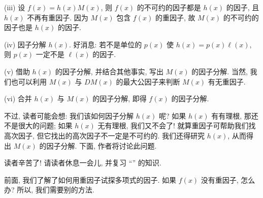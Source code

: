 (iii) 设 $f(x) = h(x) M(x)$, 则 $f(x)$ 的不可约的因子都是 $h(x)$ 的因子, 且 $h(x)$ 不再有重因子. 因为 $M(x)$ 包含 $f(x)$ 的重因子, 故 $M(x)$ 的不可约的因子也是 $h(x)$ 的因子.

(iv) 因子分解 $h(x)$. 好消息: 若不是单位的 $p(x)$ 使 $h(x) = p(x) \ell(x)$, 则 $p(x)$ 一定不是 $\ell (x)$ 的因子.

(v) 借助 $h(x)$ 的因子分解, 并结合其他事实, 写出 $M(x)$ 的因子分解. 当然, 我们也可以利用 $M(x)$ 与 $DM(x)$ 的最大公因子来判断 $M(x)$ 有无重因子.

(vi) 合并 $h(x)$ 与 $M(x)$ 的因子分解, 即得 $f(x)$ 的因子分解.

不过, 读者可能会想: 我们该如何因子分解 $h(x)$ 呢? 如果 $h(x)$ 有有理根, 那还不是很大的问题; 如果 $h(x)$ 无有理根, 我们又不会了! 就算重因子可帮助我们找高次因子, 但它找出的高次因子不一定是不可约的. 我们还得研究 $h(x)$, 从而得出 $M(x)$ 的因子分解. 下面, 作者将讨论此问题.

读者辛苦了! 请读者休息一会儿, 并复习 ``\Interpolation '' 的知识.

\myLine

前面, 我们了解了如何用重因子试探多项式的因子. 如果 $f(x)$ 没有重因子, 怎么办? 所以, 我们需要别的方法.
